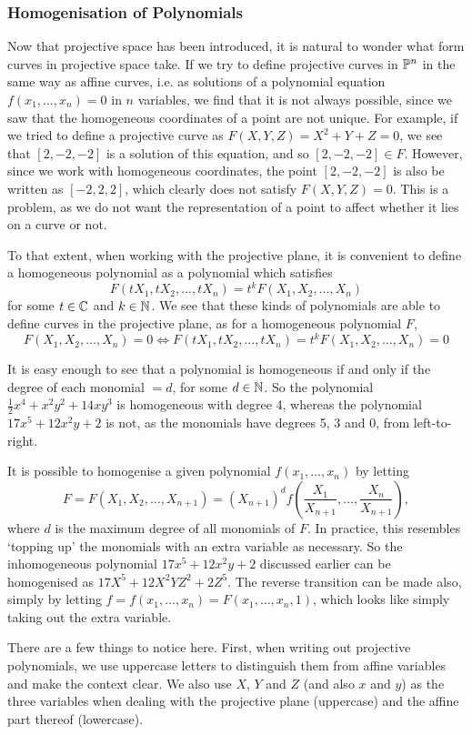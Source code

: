 \subsubsection{Homogenisation of Polynomials}
Now that projective space has been introduced, it is natural to wonder what form curves in projective space take.
If we try to define projective curves in $\mathbb{P}^{n}$ in the same way as affine curves, i.e. as solutions of a polynomial equation $f(x_1,\ldots,x_n)=0$ in $n$ variables, we find that it is not always possible, since we saw that the homogeneous coordinates of a point are not unique.
For example, if we tried to define a projective curve as $F(X,Y,Z)=X^2+Y+Z=0$, we see that $[2,-2,-2]$ is a solution of this equation, and so $[2,-2,-2] \in F$.
However, since we work with homogeneous coordinates, the point $[2,-2,-2]$ is also be written as $[-2,2,2]$, which clearly does not satisfy $F(X,Y,Z)=0$.
This is a problem, as we do not want the representation of a point to affect whether it lies on a curve or not.

To that extent, when working with the projective plane, it is convenient to define a homogeneous polynomial as a polynomial which satisfies
$$F(tX_1,tX_2,\ldots,tX_n)=t^k F(X_1,X_2,\ldots,X_n)$$
for some $t \in \mathbb{C}$ and $k \in \mathbb{N}$. We see that these kinds of polynomials are able to define curves in the projective plane, as for a homogeneous polynomial $F$,
$$F(X_1,X_2,\ldots,X_n)=0 \Leftrightarrow F(tX_1,tX_2,\ldots,tX_n) = t^k F(X_1,X_2,\ldots,X_n) = 0$$

It is easy enough to see that a polynomial is homogeneous if and only if the degree of each monomial $= d$, for some $d \in \mathbb{N}$.
So the polynomial $\frac{1}{2}x^4 + x^2y^2 + 14xy^3$ is homogeneous with degree 4, whereas the polynomial $17x^5 + 12x^2y + 2$ is not, as the monomials have degrees 5, 3 and 0, from left-to-right.

It is possible to homogenise a given polynomial $f(x_1,\ldots,x_n)$ by letting
$$F = F(X_1,X_2,\ldots,X_{n+1}) = (X_{n+1})^d f(\frac{X_1}{X_{n+1}},\ldots,\frac{X_n}{X_{n+1}}),$$
where $d$ is the maximum degree of all monomials of $F$.
In practice, this resembles `topping up' the monomials with an extra variable as necessary.
So the inhomogeneous polynomial $17x^5 + 12x^2y + 2$ discussed earlier can be homogenised as $17X^5 + 12X^2YZ^2 + 2Z^5$.
The reverse transition can be made also, simply by letting $f = f(x_1,\ldots,x_n) = F(x_1,\ldots,x_n,1)$, which looks like simply taking out the extra variable.

There are a few things to notice here.
First, when writing out projective polynomials, we use uppercase letters to distinguish them from affine variables and make the context clear.
We also use $X$, $Y$ and $Z$ (and also $x$ and $y$) as the three variables when dealing with the projective plane (uppercase) and the affine part thereof (lowercase).


